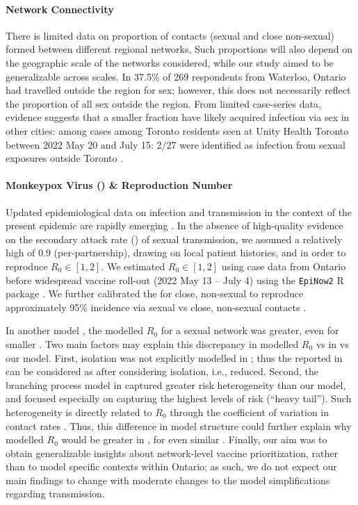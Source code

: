 \paragraph{Network Connectivity}
There is limited data on proportion of contacts (sexual and close non-sexual)
formed between different regional \GBMSM networks,
Such proportions will also depend on the geographic scale of the networks considered,
while our study aimed to be generalizable across scales.
In \cite{Armstrong2020} 37.5\% of 269 respondents from Waterloo, Ontario
had travelled outside the region for sex;
however, this does not necessarily reflect the proportion of all sex outside the region.
From limited case-series data, evidence suggests that
a smaller fraction have likely acquired \MPXV infection via sex in other cities:
among cases among Toronto residents seen at Unity Health Toronto between 2022 May 20 and July 15:
2/27 were identified as infection from sexual exposures outside Toronto
\cite[personal communication]{Mishra2022}.
\paragraph{Monkeypox Virus (\MPXV) \& Reproduction Number}
Updated epidemiological data on \MPXV infection and transmission
in the context of the present epidemic are rapidly emerging \cite{Thornhill2022,PHO2022synth}.
In the absence of high-quality evidence on
the secondary attack rate (\SAR) of sexual transmission,
we assumed a relatively high \SAR of 0.9 (per-partnership),
drawing on local patient histories, and in order to reproduce $R_0 \in [1,2]$.
We estimated $R_0 \in [1,2]$ using \MPXV case data from Ontario \cite{PHO2022ont}
before widespread vaccine roll-out (2022 May 13 -- July 4)
using the \texttt{EpiNow2} R package \cite{EpiNow2}.
We further calibrated the \SAR for close, non-sexual to reproduce
approximately 95\% incidence via sexual vs close, non-sexual contacts \cite{Vaughan2022}.
\par
In another model \cite{Endo2022},
the modelled $R_0$ for a \GBMSM sexual network was greater, even for smaller \SAR.
Two main factors may explain this discrepancy in
modelled $R_0$ vs \SAR in \cite{Endo2022} vs our model.
First, isolation was not explicitly modelled in \cite{Endo2022};
thus the reported \SAR in \cite{Endo2022} can be considered as
after considering isolation, i.e., reduced.
Second, the branching process model in \cite{Endo2022}
captured greater risk heterogeneity than our model,
and focused especially on capturing the highest levels of risk (``heavy tail'').
Such heterogeneity is directly related to $R_0$
through the coefficient of variation in contact rates \cite{Anderson1986}.
Thus, this difference in model structure could further explain why
modelled $R_0$ would be greater in \cite{Endo2022}, for even similar \SAR.
Finally, our aim was to obtain generalizable insights about network-level vaccine prioritization,
rather than to model specific contexts within Ontario;
as such, we do not expect our main findings to change
with moderate changes to the model simplifications regarding transmission.
